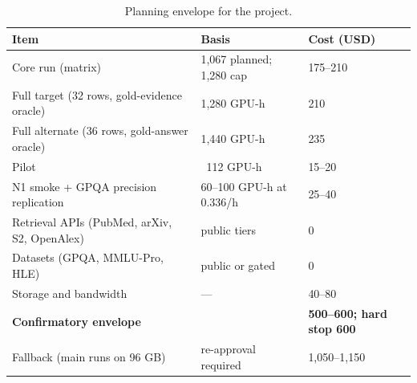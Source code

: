 \begin{center}
    \begin{table}[ht]
        \centering
        \caption{Planning envelope for the project.}
        \renewcommand{\arraystretch}{1.6}
        \begin{tabular}{|p{}|p{}|p{}|}
            \hline
            Item                                                & Basis                            & Cost (USD)          \\
            \hline
            Core run (matrix)                                    & 1,067 planned; 1,280 cap         & 175--210            \\
            \hline
            Full target (32 rows, gold-evidence oracle)          & 1,280 GPU-h                      & 210                 \\
            \hline
            Full alternate (36 rows, gold-answer oracle)         & 1,440 GPU-h                      & 235                 \\
            \hline
            Pilot                                                & ~112 GPU-h                       & 15--20              \\
            \hline
            N1 smoke + GPQA precision replication                & 60--100 GPU-h at 0.336/h         & 25--40              \\
            \hline
            Retrieval APIs (PubMed, arXiv, S2, OpenAlex)        & public tiers                     & 0                   \\
            \hline
            Datasets (GPQA, MMLU-Pro, HLE)                      & public or gated                  & 0                   \\
            \hline
            Storage and bandwidth                               & ---                              & 40--80              \\
            \hline
            \textbf{Confirmatory envelope}                      &                                  & \textbf{500--600; hard stop 600} \\
            \hline
            Fallback (main runs on 96 GB)                       & re-approval required             & 1,050--1,150        \\
            \hline
        \end{tabular}
        \label{tab:budget-sic}
    \end{table}
\end{center}

